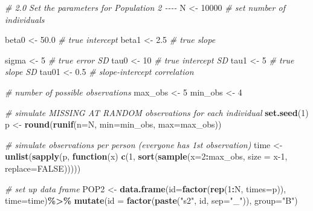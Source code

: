 \documentclass[
]{article}
\newenvironment{Shaded}{\begin{snugshade}}{\end{snugshade}}
\newcommand{\AttributeTok}[1]{\textcolor[rgb]{0.13,0.29,0.53}{#1}}
\newcommand{\CommentTok}[1]{\textcolor[rgb]{0.56,0.35,0.01}{\textit{#1}}}
\newcommand{\ConstantTok}[1]{\textcolor[rgb]{0.56,0.35,0.01}{#1}}
\newcommand{\ControlFlowTok}[1]{\textcolor[rgb]{0.13,0.29,0.53}{\textbf{#1}}}
\newcommand{\DecValTok}[1]{\textcolor[rgb]{0.00,0.00,0.81}{#1}}
\newcommand{\FloatTok}[1]{\textcolor[rgb]{0.00,0.00,0.81}{#1}}
\newcommand{\FunctionTok}[1]{\textcolor[rgb]{0.13,0.29,0.53}{\textbf{#1}}}
\newcommand{\NormalTok}[1]{#1}
\newcommand{\OtherTok}[1]{\textcolor[rgb]{0.56,0.35,0.01}{#1}}
\newcommand{\SpecialCharTok}[1]{\textcolor[rgb]{0.81,0.36,0.00}{\textbf{#1}}}
\newcommand{\StringTok}[1]{\textcolor[rgb]{0.31,0.60,0.02}{#1}}
\begin{document}
\begin{Shaded}
\begin{Highlighting}[]
\CommentTok{\# 2.0 Set the parameters for Population 2 {-}{-}{-}{-}}
\NormalTok{N }\OtherTok{\textless{}{-}} \DecValTok{10000} \CommentTok{\# set number of individuals}

\NormalTok{beta0 }\OtherTok{\textless{}{-}} \FloatTok{50.0} \CommentTok{\# true intercept}
\NormalTok{beta1 }\OtherTok{\textless{}{-}} \FloatTok{2.5} \CommentTok{\# true slope}

\NormalTok{sigma }\OtherTok{\textless{}{-}} \DecValTok{5}  \CommentTok{\# true error SD}
\NormalTok{tau0  }\OtherTok{\textless{}{-}} \DecValTok{10}    \CommentTok{\# true intercept SD}
\NormalTok{tau1  }\OtherTok{\textless{}{-}} \DecValTok{5}  \CommentTok{\# true slope SD}
\NormalTok{tau01 }\OtherTok{\textless{}{-}} \FloatTok{0.5}  \CommentTok{\# slope{-}intercept correlation}

\CommentTok{\# number of possible observations}
\NormalTok{max\_obs }\OtherTok{\textless{}{-}} \DecValTok{5}
\NormalTok{min\_obs }\OtherTok{\textless{}{-}} \DecValTok{4}

\CommentTok{\# simulate MISSING AT RANDOM observations for each individual}
\FunctionTok{set.seed}\NormalTok{(}\DecValTok{1}\NormalTok{)}
\NormalTok{p }\OtherTok{\textless{}{-}} \FunctionTok{round}\NormalTok{(}\FunctionTok{runif}\NormalTok{(}\AttributeTok{n=}\NormalTok{N, }\AttributeTok{min=}\NormalTok{min\_obs, }\AttributeTok{max=}\NormalTok{max\_obs))}

\CommentTok{\# simulate observations per person (everyone has 1st observation)}
\NormalTok{time }\OtherTok{\textless{}{-}} \FunctionTok{unlist}\NormalTok{(}\FunctionTok{sapply}\NormalTok{(p, }\ControlFlowTok{function}\NormalTok{(x) }\FunctionTok{c}\NormalTok{(}\DecValTok{1}\NormalTok{, }\FunctionTok{sort}\NormalTok{(}\FunctionTok{sample}\NormalTok{(}\AttributeTok{x=}\DecValTok{2}\SpecialCharTok{:}\NormalTok{max\_obs, }\AttributeTok{size =}\NormalTok{ x}\DecValTok{{-}1}\NormalTok{, }\AttributeTok{replace=}\ConstantTok{FALSE}\NormalTok{)))))}

\CommentTok{\# set up data frame}
\NormalTok{POP2 }\OtherTok{\textless{}{-}} \FunctionTok{data.frame}\NormalTok{(}\AttributeTok{id=}\FunctionTok{factor}\NormalTok{(}\FunctionTok{rep}\NormalTok{(}\DecValTok{1}\SpecialCharTok{:}\NormalTok{N, }\AttributeTok{times=}\NormalTok{p)), }\AttributeTok{time=}\NormalTok{time)}\SpecialCharTok{\%\textgreater{}\%}
  \FunctionTok{mutate}\NormalTok{(}\AttributeTok{id =} \FunctionTok{factor}\NormalTok{(}\FunctionTok{paste}\NormalTok{(}\StringTok{"s2"}\NormalTok{, id, }\AttributeTok{sep=}\StringTok{"\_"}\NormalTok{)),}
         \AttributeTok{group=}\StringTok{"B"}\NormalTok{)}


\end{Highlighting}
\end{Shaded}
\end{document}
